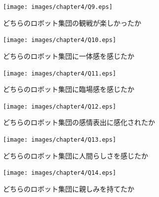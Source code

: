 \newpage

\vspace{1cm}
\begin{figure}[!h]
 \begin{center}
  \centering
  \texttt{[image: images/chapter4/Q9.eps]}
  \caption{どちらのロボット集団の観戦が楽しかったか}
  \label{Q9}
 \end{center}
\end{figure}

\vspace{1cm}
\begin{figure}[!h]
 \begin{center}
  \centering
  \texttt{[image: images/chapter4/Q10.eps]}
  \caption{どちらのロボット集団に一体感を感じたか}
  \label{Q10}
 \end{center}
\end{figure}

\newpage

\vspace{1cm}
\begin{figure}[!h]
 \begin{center}
  \centering
  \texttt{[image: images/chapter4/Q11.eps]}
  \caption{どちらのロボット集団に臨場感を感じたか}
  \label{Q11}
 \end{center}
\end{figure}

\vspace{1cm}
\begin{figure}[!h]
 \begin{center}
  \centering
  \texttt{[image: images/chapter4/Q12.eps]}
  \caption{どちらのロボット集団の感情表出に感化されたか}
  \label{Q12}
 \end{center}
\end{figure}

\newpage

\vspace{1cm}
\begin{figure}[!h]
 \begin{center}
  \centering
  \texttt{[image: images/chapter4/Q13.eps]}
  \caption{どちらのロボット集団に人間らしさを感じたか}
  \label{Q13}
 \end{center}
\end{figure}

\vspace{1cm}
\begin{figure}[!h]
 \begin{center}
  \centering
  \texttt{[image: images/chapter4/Q14.eps]}
  \caption{どちらのロボット集団に親しみを持てたか}
  \label{Q14}
 \end{center}
\end{figure}

